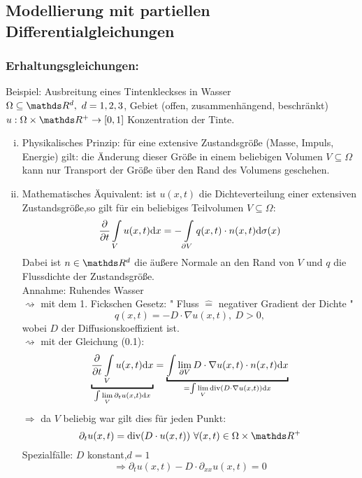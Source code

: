 \subsection{Modellierung mit partiellen Differentialgleichungen}

\subsubsection{Erhaltungsgleichungen:}
Beispiel: Ausbreitung eines Tintenkleckses in Wasser\\
$\Omega \subseteq \R^d,~d=1,2,3$, Gebiet (offen, zusammenhängend, beschränkt)\\
$u : \Omega \times \R^+ \to [0,1]$ Konzentration der Tinte.

\begin{enumerate}[(i)]
	\item Physikalisches Prinzip: für eine extensive Zustandsgröße (Masse, Impuls, Energie) gilt: die Änderung dieser Größe in einem beliebigen Volumen $V \subseteq \Omega$ kann nur Transport der Größe über den Rand des Volumens geschehen.
	\item Mathematisches Äquivalent: ist $u(x,t)$ die Dichteverteilung einer extensiven Zustandsgröße,so gilt für ein beliebiges Teilvolumen $V\subseteq \Omega$:
	\begin{align}
	\frac{\partial  }{\partial t}  \int\limits_{V} u(x,t) \mathrm{d} x = -\int\limits_{\partial V} q(x,t)\cdot n(x,t) \mathrm{d} \sigma(x)
	\end{align}
	Dabei ist $n\in \R^d$ die äußere Normale an den Rand von $V$ und $q$ die Flussdichte der Zustandsgröße.\\
	Annahme: Ruhendes Wasser\\
	$\rightsquigarrow$ mit dem 1. Fickschen Gesetz: " Fluss $\hat{=}$ negativer Gradient der Dichte "\\
	\[
	q(x,t) = - D\cdot \nabla u(x,t),~ D>0,
	\]
	wobei $D$ der Diffusionskoeffizient ist.\\
	$\rightsquigarrow$ mit der Gleichung (0.1):
	\[
	\underbracket{\diff{ }{t} \int\limits_{V} u(x,t)\dint x}_{\int\lim\limits_{V}\partial_t u(x,t)\dint x} =
	\underbracket{\int\lim\limits_{\partial V}D\cdot \nabla u(x,t)\cdot n(x,t)\dint x}_{= \int\lim\limits_{V} \divv(D\cdot \nabla u(x,t))\dint x}
	\]
	$\Rightarrow$ da $V$ beliebig war gilt dies für jeden Punkt:
	\[
	\partial_t u(x,t) = \divv(D\cdot u(x,t)) ~ \forall (x,t)\in \Omega\times \R^+
	\]
	Spezialfälle: $D$ konstant,$d=1$
	\[
	\Rightarrow \partial_t u(x,t) - D\cdot \partial_{xx} u(x,t) = 0
	\]
\end{enumerate}

